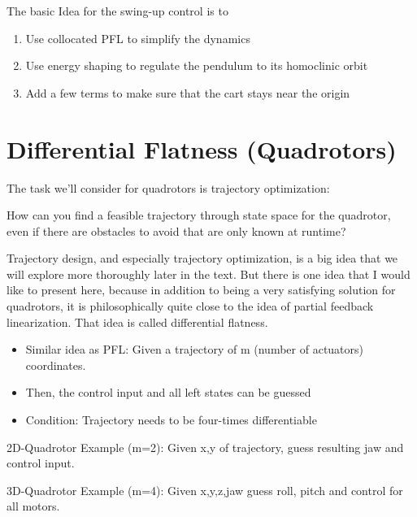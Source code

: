The basic Idea for the swing-up control is to
\begin{enumerate}
\item Use collocated PFL to simplify the dynamics
\item Use energy shaping to regulate the pendulum to its homoclinic orbit
\item Add a few terms to make sure that the cart stays near the origin
\end{enumerate}


\section{Differential Flatness (Quadrotors)}
The task we'll consider for quadrotors is trajectory optimization:

How can you find a feasible trajectory through state space for the quadrotor, even if there are obstacles to avoid that are only known at runtime? 

Trajectory design, and especially trajectory optimization, is a big idea that we will explore more thoroughly later in the text. But there is one idea that I would like to present here, because in addition to being a very satisfying solution for quadrotors, it is philosophically quite close to the idea of partial feedback linearization. That idea is called differential flatness.

\begin{itemize}
\item Similar idea as PFL: Given a trajectory of m (number of actuators) coordinates. 
\item Then, the control input and all left states can be guessed
\item Condition: Trajectory needs to be four-times differentiable
\end{itemize}

2D-Quadrotor Example (m=2): Given x,y of trajectory, guess resulting jaw and control input.

3D-Quadrotor Example (m=4): Given x,y,z,jaw guess roll, pitch and control for all motors.

